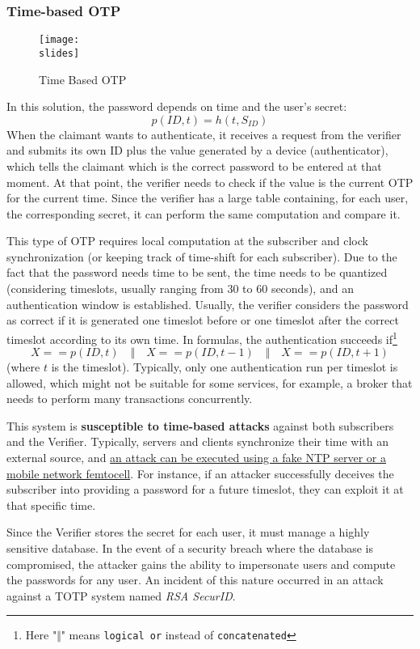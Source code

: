 \subsubsection{Time-based OTP}
\begin{figure}[h]
  \centering
  \texttt{[image: \\slides]}
  \caption{Time Based OTP}
\end{figure}
In this solution, the password depends on time and the user's secret:
\[p(ID, t) = h(t, S_{ID})\]
When the claimant wants to authenticate, it receives a request from the verifier and submits its own ID plus the value generated by a device (authenticator), which tells the claimant which is the correct password to be entered at that moment. At that point, the verifier needs to check if the value is the current OTP for the current time. Since the verifier has a large table containing, for each user, the corresponding secret, it can perform the same computation and compare it.

This type of OTP requires local computation at the subscriber and clock synchronization (or keeping track of time-shift for each subscriber). Due to the fact that the password needs time to be sent, the time needs to be quantized (considering timeslots, usually ranging from 30 to 60 seconds), and an authentication window is established. Usually, the verifier considers the password as correct if it is generated one timeslot before or one timeslot after the correct timeslot according to its own time. In formulas, the authentication succeeds if\footnote{Here "$\Vert$" means \texttt{logical or} instead of \texttt{concatenated}}
\[
  X == p(ID, t) \quad \Vert \quad
  X == p(ID, t - 1)
  \quad \Vert \quad X == p(ID, t + 1)
\]
(where \(t\) is the timeslot). Typically, only one authentication run per timeslot is allowed, which might not be suitable for some services, for example, a broker that needs to perform many transactions concurrently.

This system is \textbf{susceptible to time-based attacks} against both subscribers and the Verifier. Typically, servers and clients synchronize their time with an external source, and \ul{an attack can be executed using a fake NTP server or a mobile network femtocell}. For instance, if an attacker successfully deceives the subscriber into providing a password for a future timeslot, they can exploit it at that specific time.

Since the Verifier stores the secret for each user, it must manage a highly sensitive database. In the event of a security breach where the database is compromised, the attacker gains the ability to impersonate users and compute the passwords for any user. An incident of this nature occurred in an attack against a TOTP system named \textit{RSA SecurID}.

